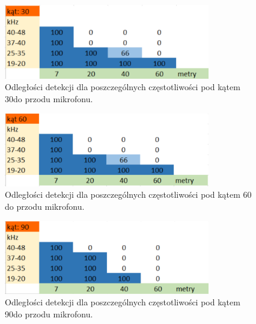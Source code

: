 \documentclass{sprz}
\begin{document}
  \begin{figure}[h]
    \centering
    \includegraphics[width=0.8\textwidth]{sprz/angle30.png}
    \caption{Odległości detekcji dla poszczególnych częstotliwości pod kątem 30\textdegree do przodu mikrofonu.}
    \label{img:angle30}
  \end{figure} 

  \begin{figure}[h]
    \centering
    \includegraphics[width=0.8\textwidth]{sprz/angle60.png}
    \caption{Odległości detekcji dla poszczególnych częstotliwości pod kątem 60 do przodu mikrofonu.}
    \label{img:angle60}
  \end{figure} 

  \begin{figure}[h]
    \centering
    \includegraphics[width=0.8\textwidth]{sprz/angle90.png}
    \caption{Odległości detekcji dla poszczególnych częstotliwości pod kątem 90\textdegree do przodu mikrofonu.}
    \label{img:angle90}
  \end{figure}
\end{document}
